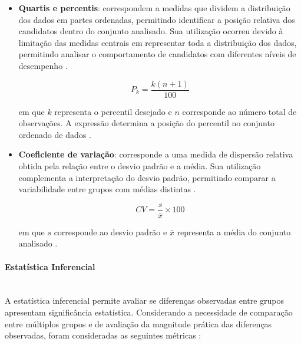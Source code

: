 \documentclass[a4paper,10pt, twocolumn]{article}
\begin{document}
\begin{itemize}
em que $s$ representa o desvio padrão, $x_i$ corresponde a cada observação, $\bar{x}$ representa a média do conjunto de dados e $n$ corresponde ao número total de observações \cite{labone_estatistica}.

\item \textbf{Quartis e percentis}: correspondem a medidas que dividem a distribuição dos dados em partes ordenadas, permitindo identificar a posição relativa dos candidatos dentro do conjunto analisado. Sua utilização ocorreu devido à limitação das medidas centrais em representar toda a distribuição dos dados, permitindo analisar o comportamento de candidatos com diferentes níveis de desempenho \cite{labone_estatistica}.

\begin{equation}
P_k=
\frac{k(n+1)}{100}
\end{equation}

em que $k$ representa o percentil desejado e $n$ corresponde ao número total de observações. A expressão determina a posição do percentil no conjunto ordenado de dados \cite{labone_estatistica}.

\item \textbf{Coeficiente de variação}: corresponde a uma medida de dispersão relativa obtida pela relação entre o desvio padrão e a média. Sua utilização complementa a interpretação do desvio padrão, permitindo comparar a variabilidade entre grupos com médias distintas \cite{labone_estatistica}.

\begin{equation}
CV=
\frac{s}{\bar{x}}
\times100
\end{equation}

em que $s$ corresponde ao desvio padrão e $\bar{x}$ representa a média do conjunto analisado \cite{labone_estatistica}.

\end{itemize}

\paragraph{Estatística Inferencial}
\mbox{}\\

A estatística inferencial permite avaliar se diferenças observadas entre grupos apresentam significância estatística. Considerando a necessidade de comparação entre múltiplos grupos e de avaliação da magnitude prática das diferenças observadas, foram consideradas as seguintes métricas \cite{field2018discovering,cohen1988statistical}:
\end{document}
